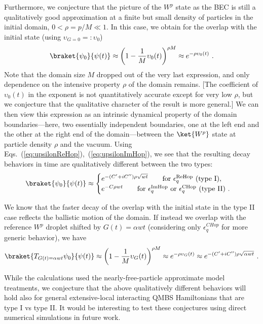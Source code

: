 \documentclass[prx,letterpaper,aps,superscriptaddress,floatfix,twocolumn,nofootinbib]{revtex4-2}
\theoremstyle{definition}
\begin{document}
%
Furthermore, we conjecture that the picture of the $W^p$ state as the BEC is still a qualitatively good approximation at a finite but small density of particles in the initial domain, $0 < \rho = p/M \ll 1$.
%
In this case, we obtain for the overlap with the initial state (using $\upsilon_{G=0} =: \upsilon_0$)
\begin{equation}
\braket{\psi_0}{\psi(t)} \approx \left(1 - \frac{1}{M} \upsilon_{0}(t) \right)^{\rho M} \approx e^{-\rho \upsilon_{0}(t)} ~.
\end{equation}
%
Note that the domain size $M$ dropped out of the very last expression, and only dependence on the intensive property $\rho$ of the domain remains.
[The coefficient of $\upsilon_{0}(t)$ in the exponent is not quantitatively accurate except for very low $\rho$, but we conjecture that the qualitative character of the result is more general.]
%
We can then view this expression as an intrinsic dynamical property of the domain boundaries---here, two essentially independent boundaries, one at the left end and the other at the right end of the domain---between the $\ket{W^p}$ state at particle density $\rho$ and the vacuum.
%
Using Eqs.~(\ref{eq:upsilonReHop}),~(\ref{eq:upsilonImHop}), we see that the resulting decay behaviors in time are qualitatively different between the two types: 
\begin{equation}
\braket{\psi_0}{\psi(t)} \approx
\begin{cases}
e^{-(C'+iC'') \rho \sqrt{wt}} \qquad \text{for}~\epsilon_q^{\text{ReHop}}~\text{(type I)}, \\
e^{-C \rho wt} \qquad \text{for}~\epsilon_q^{\text{ImHop}}~\text{or}~\epsilon_q^{\text{CHop}}~\text{(type II)} ~.
\end{cases}
\end{equation}

We know that the faster decay of the overlap with the initial state in the type II case reflects the ballistic motion of the domain.
%
If instead we overlap with the reference $W^p$ droplet shifted by $G(t) = \alpha w t$ (considering only $\epsilon^{CHop}_q$ for more generic behavior), we have
\begin{equation}
\braket{T_{G(t) = \alpha w t} \psi_0}{\psi(t)} \approx \left(1 - \frac{1}{M} \upsilon_{G}(t) \right)^{\rho M} \approx e^{-\rho \upsilon_{G}(t)} \approx e^{-(C' + i C'') \rho \sqrt{\alpha w t}} ~.
\end{equation}

While the calculations used the nearly-free-particle approximate model treatments, we conjecture that the above qualitatively different behaviors will hold also for general extensive-local interacting QMBS Hamiltonians that are type I vs type II.
%
It would be interesting to test these conjectures using direct numerical simulations in future work.
%
\end{document}
